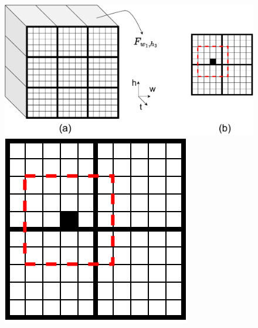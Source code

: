 \documentclass[../main.tex]{subfiles}
\begin{document}
\begin{figure}[h]

    \centering
    \hspace{-20mm}
    \begin{subcaptionblock}{.4\textwidth}
        \centering
        \includegraphics[width=\textwidth]{images/quantile_mapping.drawio.pdf}
        \caption{}\label{}
    \end{subcaptionblock}%
    \hspace{30mm}
    \begin{subcaptionblock}{0.20\textwidth}
        \centering
        \includegraphics[width=\textwidth]{images/quantile_conv.drawio.pdf}
        \caption{}\label{}
    \end{subcaptionblock}%
    

\end{figure}
\end{document}
